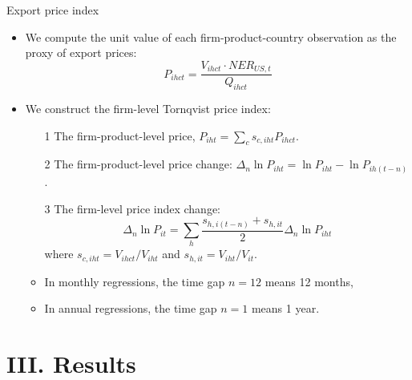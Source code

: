 \documentclass[10pt]{beamer}
\begin{document}
\begin{frame}{Export price index}
    \begin{itemize}
	\item We compute the unit value of each firm-product-country observation as the proxy of export prices:
        $$
        P_{ihct}=\frac{V_{ihct}\cdot NER_{US,t}}{Q_{ihct}}
        $$
        \item We construct the firm-level Tornqvist price index:
        \begin{itemize}
            \item [1] The firm-product-level price, $P_{iht}=\sum_c s_{c,iht} P_{ihct}$.
            \item [2] The firm-product-level price change: $\Delta_n \ln P_{iht} = \ln P_{iht}-\ln P_{ih(t-n)}$.
            \item [3] The firm-level price index change:
            $$
            \Delta_n \ln P_{it} = \sum _{h} \frac{s_{h,i(t-n)}+s_{h,it}}{2} \Delta_n \ln P_{iht}
            $$
            where $s_{c,iht}=V_{ihct}/V_{iht}$ and $s_{h,it}=V_{iht}/V_{it}$.
            \item In monthly regressions, the time gap $n=12$ means 12 months, 
            \item In annual regressions, the time gap $n=1$ means 1 year.
        \end{itemize}
    \end{itemize}
\end{frame}

\section{III. Results}
\end{document}
